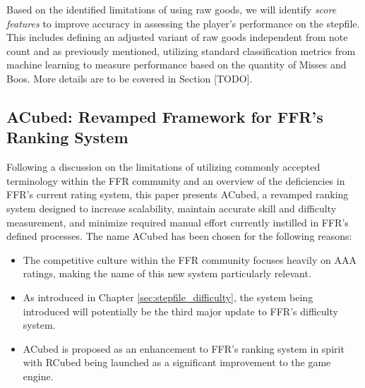 \vspace{2mm}

Based on the identified limitations of using raw goods, we will identify \textit{score features} to improve accuracy in assessing the player's performance on the stepfile. This includes defining an adjusted variant of raw goods independent from note count and as previously mentioned, utilizing standard classification metrics from machine learning to measure performance based on the quantity of Misses and Boos. More details are to be covered in Section [TODO].

\subsection{ACubed: Revamped Framework for FFR's Ranking System}

Following a discussion on the limitations of utilizing commonly accepted terminology within the FFR community and an overview of the deficiencies in FFR's current rating system, this paper presents ACubed, a revamped ranking system designed to increase scalability, maintain accurate skill and difficulty measurement, and minimize required manual effort currently instilled in FFR's defined processes. The name ACubed has been chosen for the following reasons:

\begin{itemize}
	\item The competitive culture within the FFR community focuses heavily on AAA ratings, making the name of this new system particularly relevant.
	\item As introduced in Chapter \ref{sec:stepfile_difficulty}, the system being introduced will potentially be the third major update to FFR's difficulty system.
	\item ACubed is proposed as an enhancement to FFR's ranking system in spirit with RCubed being launched as a significant improvement to the game engine.
\end{itemize}

